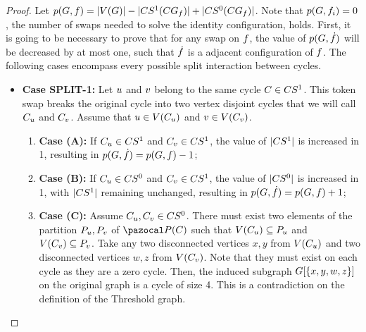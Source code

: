 \documentclass[msc]{ppgccufmg}    %
\begin{document}
\begin{proof}
Let $p(G, f) = |V(G)| - 
|CS^{1}(CG_{f})| +
|CS^{0}(CG_{f})|$.
Note that $p(G, f_{i}) = 0$, the number of swaps needed to
solve the identity configuration, holds.
First, it is going to be necessary to prove that for any swap on $f$,
the value of $p(G, \dot{f})$ will be decreased
by at most one, such that $\dot{f}$ is a adjacent configuration
of $f$.
The following cases encompass every possible split interaction between 
cycles.

\begin{itemize}
    \item \textbf{Case SPLIT-1:} Let $u$ and $v$ belong to 
    the same cycle $C \in CS^{1}$. 
    This token swap breaks the original cycle into two vertex disjoint cycles that
    we will call $C_{u}$ and $C_{v}$.
    Assume that $u \in V(C_{u})$ and 
    $v \in V(C_{v})$.
    
    \begin{enumerate}
        \item[] \textbf{Case (A):} If $C_{u} \in CS^{1}$ and 
        $C_{v} \in CS^{1}$, the value of $|CS^{1}|$ 
        is increased in 1, resulting in $p(G, \dot{f}) =
        p(G, f) - 1$;
        \item[] \textbf{Case (B):} If  $C_{u} \in CS^{0}$ and 
        $C_{v} \in CS^{1}$, the value of $|CS^{0}|$ 
        is increased in 1, with $|CS^{1}|$ remaining unchanged, 
        resulting in $p(G, \dot{f}) = p(G, f ) + 1$;
        \item[] \textbf{Case (C):} Assume $C_{u},C_{v} 
        \in CS^{0}$.
        There must exist two elements of the partition $P_{u},
        P_{v}$ of $\partitionFunc{\cycle}$ such that
        $V(C_{u}) \subseteq P_{u}$
        and $V(C_{v}) \subseteq P_{v}$.
        Take any two disconnected vertices $x,y$ from $V(C_{u})$
        and two disconnected vertices $w,z$ from $V(C_{v})$.
        Note that they must exist on each cycle as they are a zero cycle. 
        Then, the induced subgraph $G[\{x,y,w,z\}]$ on
        the original graph is a cycle of size 4.
        This is a contradiction on the definition of the Threshold graph. 
    \end{enumerate}
    

\end{itemize}
\end{proof}
\end{document}
